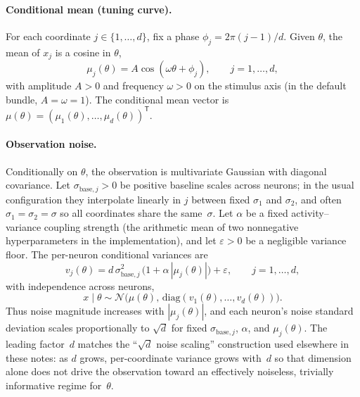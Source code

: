 \paragraph{Conditional mean (tuning curve).}
For each coordinate $j \in \{1,\ldots,d\}$, fix a phase $\phi_j = 2\pi(j-1)/d$.
Given $\theta$, the mean of $x_j$ is a cosine in $\theta$,
\begin{equation}
  \mu_j(\theta) = A \cos(\omega \theta + \phi_j),
  \qquad j = 1,\ldots,d,
\end{equation}
with amplitude $A > 0$ and frequency $\omega > 0$ on the stimulus axis (in the default bundle, $A=\omega=1$).
The conditional mean vector is $\mu(\theta) = (\mu_1(\theta),\ldots,\mu_d(\theta))^{\mathsf{T}}$.

\paragraph{Observation noise.}
Conditionally on $\theta$, the observation is multivariate Gaussian with diagonal covariance.
Let $\sigma_{\mathrm{base},j}>0$ be positive baseline scales across neurons; in the usual configuration they interpolate linearly in $j$ between fixed $\sigma_{1}$ and $\sigma_{2}$, and often $\sigma_{1}=\sigma_{2}=\sigma$ so all coordinates share the same~$\sigma$.
Let $\alpha$ be a fixed activity--variance coupling strength (the arithmetic mean of two nonnegative hyperparameters in the implementation), and let $\varepsilon>0$ be a negligible variance floor.
The per-neuron conditional variances are
\begin{equation}
  v_j(\theta)
  = d\,\sigma_{\mathrm{base},j}^{2}\,\bigl(1 + \alpha\,|\mu_j(\theta)|\bigr) + \varepsilon,
  \qquad j = 1,\ldots,d,
\end{equation}
with independence across neurons,
\begin{equation}
  x \mid \theta \sim \mathcal{N}\!\bigl(\mu(\theta),\,\mathrm{diag}(v_1(\theta),\ldots,v_d(\theta))\bigr).
\end{equation}
Thus noise magnitude increases with $|\mu_j(\theta)|$, and each neuron's noise standard deviation scales proportionally to $\sqrt{d}$ for fixed $\sigma_{\mathrm{base},j}$, $\alpha$, and $\mu_j(\theta)$.
The leading factor~$d$ matches the ``$\sqrt{d}$ noise scaling'' construction used elsewhere in these notes: as $d$ grows, per-coordinate variance grows with~$d$ so that dimension alone does not drive the observation toward an effectively noiseless, trivially informative regime for~$\theta$.